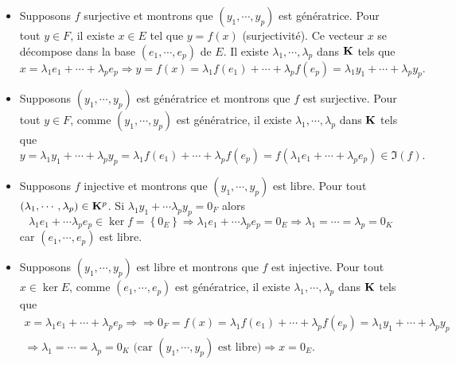 \begin{demo}
\begin{itemize}
  \item Supposons $f$ surjective et montrons que $(y_1,\cdots,y_p)$ est génératrice.\newline 
  Pour tout $y\in F$, il existe $x\in E$ tel que $y=f(x)$ (surjectivité). Ce vecteur $x$ se décompose dans la base $(e_1,\cdots,e_p)$ de $E$. Il existe $\lambda_1, \cdots, \lambda_p$ dans $\mathbf{K}$ tels que 
\[
  x = \lambda_1 e_1 + \cdots + \lambda_pe_p \Rightarrow y = f(x) = \lambda_1 f(e_1) + \cdots + \lambda_p f(e_p) = \lambda_1 y_1 + \cdots + \lambda_p y_p.
\]

  \item Supposons $(y_1,\cdots,y_p)$ est génératrice et montrons que $f$ est surjective.\newline 
  Pour tout $y\in F$, comme  $(y_1,\cdots,y_p)$ est génératrice, il existe $\lambda_1, \cdots, \lambda_p$ dans $\mathbf{K}$ tels que
\[
  y = \lambda_1 y_1 + \cdots + \lambda_p y_p = \lambda_1 f(e_1) + \cdots + \lambda_p f(e_p) = f(\lambda_1 e_1 + \cdots + \lambda_p e_p) \in \Im (f).
\]

  \item Supposons $f$ injective et montrons que $(y_1,\cdots,y_p)$ est libre.\newline
  Pour tout $(\lambda_1, \cdots, \lambda_p)\in \mathbf{K}^p$. Si $\lambda_1 y_1 + \cdots \lambda_p y_p = 0_F$ alors 
\[
\lambda_1 e_1 + \cdots \lambda_p e_p \in \ker f = \left\lbrace 0_E\right\rbrace \Rightarrow \lambda_1 e_1 + \cdots \lambda_p e_p = 0_E 
\Rightarrow \lambda_1 = \cdots = \lambda_p = 0_K
\]
car $(e_1, \cdots, e_p)$ est libre.

  \item Supposons $(y_1,\cdots,y_p)$ est libre et montrons que $f$ est injective.\newline 
  Pour tout $x\in \ker E$, comme $(e_1,\cdots, e_p)$ est génératrice, il existe  $\lambda_1, \cdots, \lambda_p$ dans $\mathbf{K}$ tels que
\begin{multline*}
  x = \lambda_1 e_1 + \cdots + \lambda_pe_p \Rightarrow \Rightarrow 0_F = f(x) = \lambda_1 f(e_1) + \cdots + \lambda_p f(e_p) = \lambda_1 y_1 + \cdots + \lambda_p y_p \\
  \Rightarrow \lambda_1 = \cdots = \lambda_p = 0_K \text{ (car $(y_1, \cdots , y_p)$ est libre)}
  \Rightarrow x = 0_E .
\end{multline*}

\end{itemize}
\end{demo}

